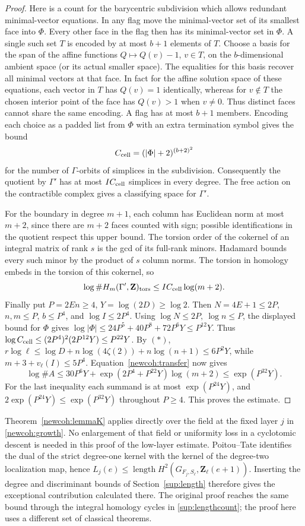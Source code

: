 \begin{proof}
Here is a count for the barycentric subdivision which allows redundant
minimal-vector equations. In any flag move the minimal-vector set of
its smallest face into \(\Phi\). Every other face in the flag then
has its minimal-vector set in \(\Phi\). A single such set \(T\) is
encoded by at most \(b+1\) elements of \(T\). Choose a basis for the
span of the affine functions \(Q\mapsto Q(v)-1\), \(v\in T\), on
the \(b\)-dimensional ambient space (or its actual smaller space).
The equalities for this basis recover all minimal vectors at that
face. In fact for the affine solution space of these equations, each
vector in \(T\) has \(Q(v)=1\) identically, whereas for \(v\notin T\)
the chosen interior point of the face has \(Q(v)>1\) when \(v\ne0\).
Thus distinct faces cannot share the same encoding. A flag has at
most \(b+1\) members. Encoding each choice as a padded list from
\(\Phi\) with an extra termination symbol gives the bound
\[
 C_{\rm cell}=(|\Phi|+2)^{(b+2)^2}
\]
for the number of \(\Gamma\)-orbits of simplices in the subdivision.
Consequently the quotient by \(\Gamma'\) has at most \(I C_{\rm cell}\)
simplices in every degree. The free action on the contractible
complex gives a classifying space for \(\Gamma'\).

For the boundary in degree \(m+1\), each column has Euclidean norm
at most \(m+2\), since there are \(m+2\) faces counted with sign;
possible identifications in the quotient respect this upper bound.
The torsion order of the cokernel of an integral matrix of rank \(s\)
is the gcd of its full-rank minors. Hadamard bounds every such minor
by the product of \(s\) column norms. The torsion in homology embeds
in the torsion of this cokernel, so
\[
 \log\#H_m(\Gamma',\mathbf Z)_{\mathrm{tors}}
 \le I C_{\rm cell}\log(m+2).
\]
Finally put \(P=2En\ge4\), \(Y=\log(2D)\ge\log2\).
Then \(N=4E+1\le2P\), \(n,m\le P\), \(b\le P^4\), and
\(\log I\le2P^4\). Using \(\log N\le2P,\ \log n\le P\),
the displayed bound for \(\Phi\) gives
\(\log|\Phi|\le24P^5+40P^8+72P^6Y\le P^{12}Y\).
Thus \(\log C_{\rm cell}\le(2P^4)^2(2P^{12}Y)\le P^{22}Y\).
By \((*)\), \(r\log\ell\le\log D+n\log(4\zeta(2))+n\log(n+1)
\le 6P^2Y\), while \(m+3+v_\ell(I)\le5P^4\).
Equation~\eqref{newcoh:transfer} now gives
\[
 \log\#A\le30P^6Y+\exp(2P^4+P^{22}Y)\log(m+2)
 \le\exp(P^{32}Y).
\]
For the last inequality each summand is at most
\(\exp(P^{24}Y)\), and \(2\exp(P^{24}Y)\le\exp(P^{32}Y)\)
throughout \(P\ge4\). This proves the estimate.
\end{proof}

Theorem~\ref{newcoh:lemmaK} applies directly over the field at the
fixed layer \(j\) in \eqref{newcoh:growth}. No enlargement of that
field or uniformity loss in a cyclotomic descent is needed in this
proof of the low-layer estimate. Poitou--Tate identifies the dual of
the strict degree-one kernel with the kernel of the degree-two
localization map, hence \(L_j(e)\le
\operatorname{length}H^2(G_{F_j,S_\ell},\mathbf Z_\ell(e+1))\).
Inserting the degree and discriminant bounds of Section~\ref{sup:length}
therefore gives the exceptional contribution calculated there. The
original proof reaches the same bound through the integral homology
cycles in \eqref{sup:lengthcount}; the proof here uses a different
set of classical theorems.

